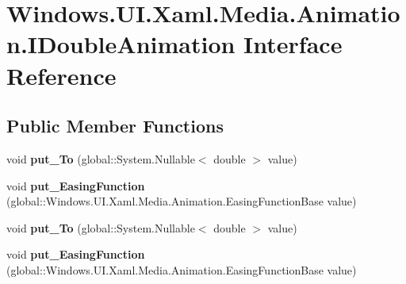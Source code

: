 \hypertarget{interface_windows_1_1_u_i_1_1_xaml_1_1_media_1_1_animation_1_1_i_double_animation}{}\section{Windows.\+U\+I.\+Xaml.\+Media.\+Animation.\+I\+Double\+Animation Interface Reference}
\label{interface_windows_1_1_u_i_1_1_xaml_1_1_media_1_1_animation_1_1_i_double_animation}
\subsection*{Public Member Functions}
\begin{DoxyCompactItemize}
\item 
\mbox{\label{interface_windows_1_1_u_i_1_1_xaml_1_1_media_1_1_animation_1_1_i_double_animation_a233b0c3571bbe89f0bb12869a5bd4d0d}} 
void {\bfseries put\+\_\+\+To} (global\+::\+System.\+Nullable$<$ double $>$ value)
\item 
\mbox{\label{interface_windows_1_1_u_i_1_1_xaml_1_1_media_1_1_animation_1_1_i_double_animation_ab1345b10d988f66b38c29728641d9fc9}} 
void {\bfseries put\+\_\+\+Easing\+Function} (global\+::\+Windows.\+U\+I.\+Xaml.\+Media.\+Animation.\+Easing\+Function\+Base value)
\item 
\mbox{\label{interface_windows_1_1_u_i_1_1_xaml_1_1_media_1_1_animation_1_1_i_double_animation_a233b0c3571bbe89f0bb12869a5bd4d0d}} 
void {\bfseries put\+\_\+\+To} (global\+::\+System.\+Nullable$<$ double $>$ value)
\item 
\mbox{\label{interface_windows_1_1_u_i_1_1_xaml_1_1_media_1_1_animation_1_1_i_double_animation_ab1345b10d988f66b38c29728641d9fc9}} 
void {\bfseries put\+\_\+\+Easing\+Function} (global\+::\+Windows.\+U\+I.\+Xaml.\+Media.\+Animation.\+Easing\+Function\+Base value)
\item 
\mbox{\label{interface_windows_1_1_u_i_1_1_xaml_1_1_media_1_1_animation_1_1_i_double_animation_a233b0c3571bbe89f0bb12869a5bd4d0d}} 

\end{DoxyCompactItemize}
